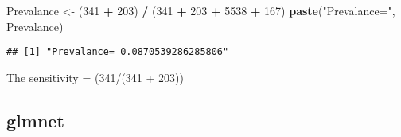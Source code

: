 \documentclass[]{article}
\newenvironment{Shaded}{\begin{snugshade}}{\end{snugshade}}
\newcommand{\KeywordTok}[1]{\textcolor[rgb]{0.13,0.29,0.53}{\textbf{#1}}}
\newcommand{\DecValTok}[1]{\textcolor[rgb]{0.00,0.00,0.81}{#1}}
\newcommand{\StringTok}[1]{\textcolor[rgb]{0.31,0.60,0.02}{#1}}
\newcommand{\OperatorTok}[1]{\textcolor[rgb]{0.81,0.36,0.00}{\textbf{#1}}}
\newcommand{\NormalTok}[1]{#1}
\begin{document}
\begin{Shaded}
\begin{Highlighting}[]
\NormalTok{Prevalance <-}\StringTok{ }\NormalTok{(}\DecValTok{341} \OperatorTok{+}\StringTok{ }\DecValTok{203}\NormalTok{) }\OperatorTok{/}\StringTok{ }\NormalTok{(}\DecValTok{341} \OperatorTok{+}\StringTok{ }\DecValTok{203} \OperatorTok{+}\StringTok{ }\DecValTok{5538} \OperatorTok{+}\StringTok{ }\DecValTok{167}\NormalTok{)}
\KeywordTok{paste}\NormalTok{(}\StringTok{"Prevalance="}\NormalTok{, Prevalance)}
\end{Highlighting}
\end{Shaded}

\begin{verbatim}
## [1] "Prevalance= 0.0870539286285806"
\end{verbatim}

The sensitivity = (341/(341 + 203))

\subsection{glmnet}\label{glmnet}
\end{document}

